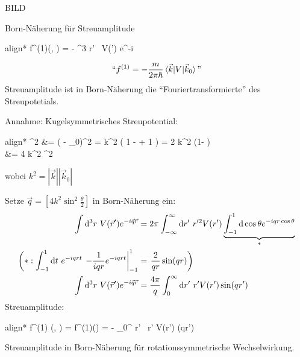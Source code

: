 	BILD
	
	Born-Näherung für Streuamplitude
		\begin{empheq}[box=\boxed]{align*}
			f^{(1)}(\theta, \phi) =
			- 
			\int \diff^3 r' ~V(') e^{-i  \cdot {}}
		\end{empheq} 
		\begin{align*}
			``f^{(1)} = -\frac{m}{2 \pi \hbar} 
			\braket{ \vec{k} | V | \vec{k}_0}\text{''}
		\end{align*}
	Streuamplitude ist in Born-Näherung die ``Fouriertransformierte'' des Streupotetials.
	
	Annahme: Kugelsymmetrisches Streupotential:
		\begin{empheq}[box=\boxed]{align*}
			^2 &= (\vec{k} - _0)^2 
			= k^2 \left( 1 - \frac{2  \vec{k}_0}{k^2}
			+ 1 \right)	
			= 2 k^2 (1- \cos \theta) \\
			&= 4 k^2 \sin^2 
		\end{empheq}
	wobei $k^2 = |\vec{k}| |\vec{k}_0|$
	
	Setze $\vec{q} = \left[ 4 k^2 \sin^2 \frac{\theta}{2} 
	\right]$ in Born-Näherung ein:
		\begin{align*}
			\int \mathrm{d}^3 r ~V(\vec{r}') e^{-i \vec{q} \vec{r}}
			&= 2 \pi \int_{-\infty}^{\infty} \mathrm{d} r' 
			~r'^2 V(r') 
			\underbrace{\int_{-1}^1 \mathrm{d} \cos \theta 
			e^{-iqr \cos \theta}}_{\substack{*}} \\
			\left(
			*: \int_{-1}^1 \mathrm{d} t ~e^{-iqr t} \right.
			\left. 
				- \frac{1}{iqr} e^{-iqrt}
			\right|_{-1}^1
			&= 
				\left. \frac{2}{qr} \sin (qr)
			\right) \\
			\int \mathrm{d}^3 r ~V(\vec{r}') e^{-i \vec{q} \vec{r}}
			&= \frac{4 \pi}{q} \int_{0}^{\infty}
			\mathrm{d} r' ~r' V(r') \sin (qr')
		\end{align*}
	Streuamplitude: 
		\begin{empheq}[box=\boxed]{align*}
			f^{(1)} (\theta, \phi) = f^{(1)}(\theta)
			= -  
			\int_0^{\infty} \diff r' ~r' V(r') \sin (qr')
		\end{empheq}
	Streuamplitude in Born-Näherung für rotationssymmetrische Wechselwirkung.
	
